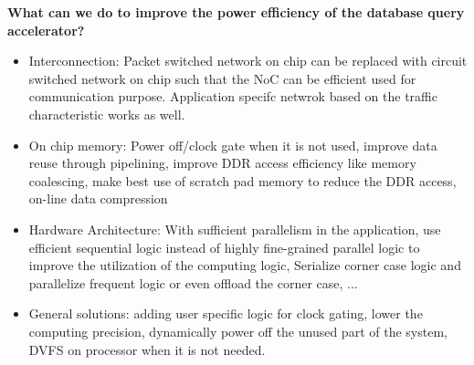 \textbf{What can we do to improve the power efficiency of the database query accelerator?} 
\begin{itemize}
\item Interconnection: Packet switched network on chip can be replaced with circuit 
    switched network on chip such that the NoC can be efficient used for communication purpose. 
    Application specifc netwrok based on the traffic characteristic works as well.

\item On chip memory: Power off/clock gate when it is not used, improve data reuse through
    pipelining, improve DDR access efficiency like memory coalescing, 
    make best use of scratch pad memory to reduce the DDR access, on-line data compression

\item Hardware Architecture: With sufficient parallelism in the application, use efficient
    sequential logic instead of highly fine-grained parallel logic to improve the utilization 
    of the computing logic, Serialize corner case logic and parallelize frequent logic or 
even offload the corner case, ...

\item General solutions: adding user specific logic for clock gating, lower the computing precision,
    dynamically power off the unused part of the system, DVFS on processor when it is not needed.
\end{itemize}
